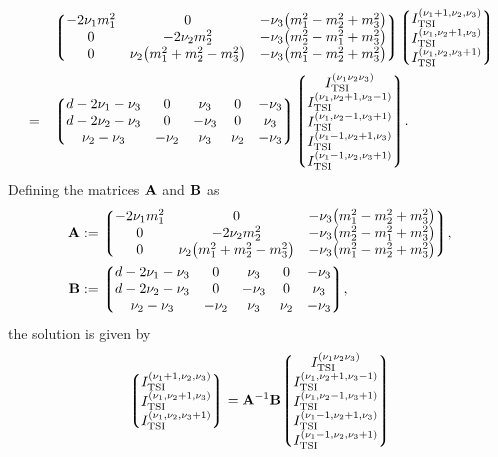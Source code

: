 \documentclass{article}
\begin{document}
        \begin{equation}
            \begin{aligned}
                & & & \mqty*(
                    -2 \nu_1 m_1^2 & 0 & -\nu_3 \qty(m_1^2 - m_2^2 + m_3^2) \\
                    0 & -2 \nu_2 m_2^2 & -\nu_3 \qty(m_2^2 - m_1^2 + m_3^2) \\
                    0 & \nu_2 \qty(m_1^2 + m_2^2 - m_3^2) & -\nu_3 \qty(m_1^2 - m_2^2 + m_3^2)
                ) \mqty*(\TSI{\nu_1 + 1, \nu_2, \nu_3} \\ \TSI{\nu_1, \nu_2 + 1, \nu_3} \\ \TSI{\nu_1, \nu_2, \nu_3 + 1}) \\
                & = & & \mqty*(
                    d - 2 \nu_1 - \nu_3 & 0 & \nu_3 & 0 & -\nu_3 \\
                    d - 2 \nu_2 - \nu_3 & 0 & -\nu_3 & 0 & \nu_3 \\
                    \nu_2 - \nu_3 & -\nu_2 & \nu_3 & \nu_2 & -\nu_3
                ) \mqty*(
                    \TSI{\nu_1 \nu_2 \nu_3} \\
                    \TSI{\nu_1, \nu_2 + 1, \nu_3 - 1} \\ \TSI{\nu_1, \nu_2 - 1, \nu_3 + 1} \\
                    \TSI{\nu_1 - 1, \nu_2 + 1, \nu_3} \\ \TSI{\nu_1 - 1, \nu_2, \nu_3 + 1}
                ).
            \end{aligned}
        \end{equation}
        Defining the matrices $\vb{A}$ and $\vb{B}$ as
        \begin{align}
            \vb{A} & := \mqty*(
                -2 \nu_1 m_1^2 & 0 & -\nu_3 \qty(m_1^2 - m_2^2 + m_3^2) \\
                0 & -2 \nu_2 m_2^2 & -\nu_3 \qty(m_2^2 - m_1^2 + m_3^2) \\
                0 & \nu_2 \qty(m_1^2 + m_2^2 - m_3^2) & -\nu_3 \qty(m_1^2 - m_2^2 + m_3^2)
            ), \\
            \vb{B} & := \mqty*(
                d - 2 \nu_1 - \nu_3 & 0 & \nu_3 & 0 & -\nu_3 \\
                d - 2 \nu_2 - \nu_3 & 0 & -\nu_3 & 0 & \nu_3 \\
                \nu_2 - \nu_3 & -\nu_2 & \nu_3 & \nu_2 & -\nu_3
            ),
        \end{align}
        the solution is given by
        \begin{equation}
            \mqty*(\TSI{\nu_1 + 1, \nu_2, \nu_3} \\ \TSI{\nu_1, \nu_2 + 1, \nu_3} \\ \TSI{\nu_1, \nu_2, \nu_3 + 1}) = \vb{A}^{-1} \vb{B} \mqty*(
                \TSI{\nu_1 \nu_2 \nu_3} \\
                \TSI{\nu_1, \nu_2 + 1, \nu_3 - 1} \\ \TSI{\nu_1, \nu_2 - 1, \nu_3 + 1} \\
                \TSI{\nu_1 - 1, \nu_2 + 1, \nu_3} \\ \TSI{\nu_1 - 1, \nu_2, \nu_3 + 1}
            )
            \label{eq:IBP-solution}
        \end{equation}
\end{document}
